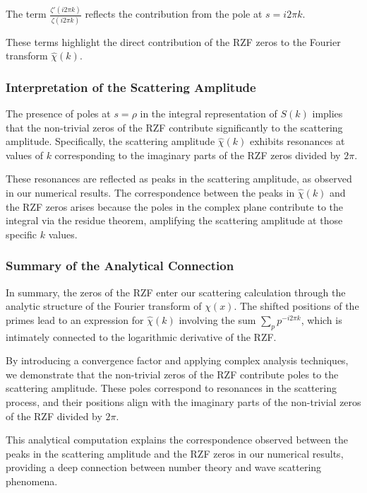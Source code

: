 \documentclass[11pt, oneside]{article}
\begin{document}
The term $\frac{\zeta'(i 2\pi k)}{\zeta(i 2\pi k)}$ reflects the contribution from the pole at $s = i 2\pi k$.

These terms highlight the direct contribution of the RZF zeros to the Fourier transform $\hat{\chi}(k)$.

\subsubsection{Interpretation of the Scattering Amplitude}

The presence of poles at $s = \rho$ in the integral representation of $S(k)$ implies that the non-trivial zeros of the RZF contribute significantly to the scattering amplitude. Specifically, the scattering amplitude $\hat{\chi}(k)$ exhibits resonances at values of $k$ corresponding to the imaginary parts of the RZF zeros divided by $2\pi$.

These resonances are reflected as peaks in the scattering amplitude, as observed in our numerical results. The correspondence between the peaks in $\hat{\chi}(k)$ and the RZF zeros arises because the poles in the complex plane contribute to the integral via the residue theorem, amplifying the scattering amplitude at those specific $k$ values.

\subsubsection{Summary of the Analytical Connection}

In summary, the zeros of the RZF enter our scattering calculation through the analytic structure of the Fourier transform of $\chi(x)$. The shifted positions of the primes lead to an expression for $\hat{\chi}(k)$ involving the sum $\sum_{p} p^{-i 2\pi k}$, which is intimately connected to the logarithmic derivative of the RZF.

By introducing a convergence factor and applying complex analysis techniques, we demonstrate that the non-trivial zeros of the RZF contribute poles to the scattering amplitude. These poles correspond to resonances in the scattering process, and their positions align with the imaginary parts of the non-trivial zeros of the RZF divided by $2\pi$.

This analytical computation explains the correspondence observed between the peaks in the scattering amplitude and the RZF zeros in our numerical results, providing a deep connection between number theory and wave scattering phenomena.
\end{document}
